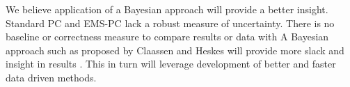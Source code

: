 \documentclass[a4paper, english]{article}
\begin{document}
We believe application of a Bayesian approach will provide a better insight.
Standard PC and EMS-PC lack a robust measure of uncertainty.
There is no baseline or correctness measure to compare results or data with
A Bayesian approach such as proposed by Claassen and Heskes will provide more slack and insight in results \cite{claassen2012}.
This in turn will leverage development of better and faster data driven methods.

{}

\end{document}
